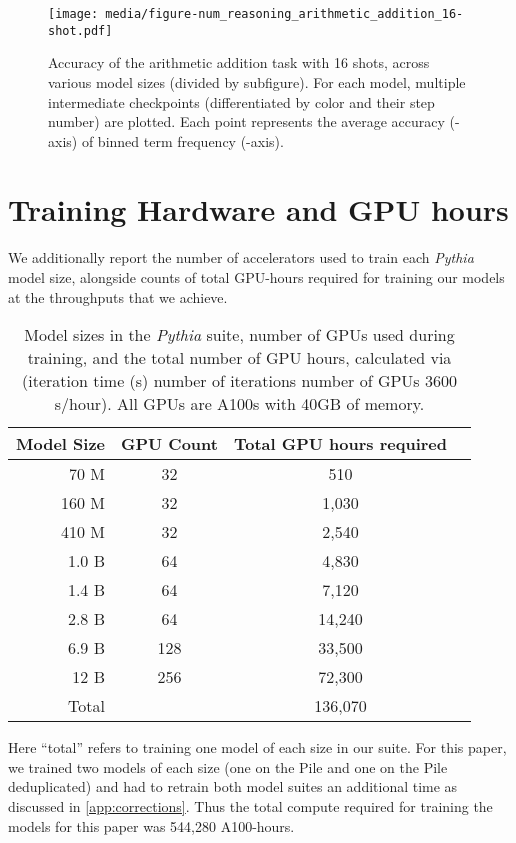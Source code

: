 \documentclass{article}
\theoremstyle{plain}
\theoremstyle{definition}
\theoremstyle{remark}
\begin{document}
\begin{figure*}[htb]
\centering
\texttt{[image: media/figure-num\_reasoning\_arithmetic\_addition\_16-shot.pdf]}
\caption{Accuracy of the arithmetic addition task with 16 shots, across various model sizes (divided by subfigure). For each model, multiple intermediate checkpoints (differentiated by color and their step number) are plotted. Each point represents the average accuracy (-axis) of binned term frequency (-axis).}
\label{figure:addition}
\end{figure*}

\clearpage

\section{Training Hardware and GPU hours}\label{app:emissions}

We additionally report the number of accelerators used to train each \textit{Pythia} model size, alongside counts of total GPU-hours required for training our models at the throughputs that we achieve.

\begin{table}[h]
    \centering
    \begin{tabular}{rccc}\toprule
  Model Size & GPU Count & Total GPU hours required\\\midrule
          70 M  & 32 & 510 \\
         160 M  & 32 & 1,030\\
         410 M  & 32 & 2,540\\
         1.0 B  & 64 & 4,830 \\
         1.4 B  & 64 & 7,120 \\
         2.8 B  & 64 & 14,240\\
         6.9 B  & 128 & 33,500 \\
         12 B   & 256 & 72,300 \\\midrule
         Total   &  & 136,070 \\\bottomrule
    \end{tabular}
    \caption{Model sizes in the \textit{Pythia} suite, number of GPUs used during training, and the total number of GPU hours, calculated via (iteration time (s)  number of iterations  number of GPUs  3600 s/hour). All GPUs are A100s with 40GB of memory.}
	\label{table:hardware}
\end{table}

Here ``total'' refers to training one model of each size in our suite. For this paper, we trained two models of each size (one on the Pile and one on the Pile deduplicated) and had to retrain both model suites an additional time as discussed in \cref{app:corrections}. Thus the total compute required for training the models for this paper was 544,280 A100-hours.
\end{document}
